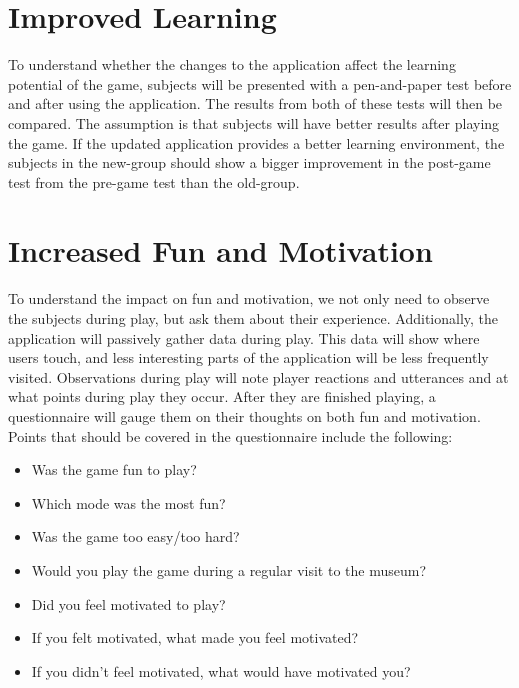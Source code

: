 
\section{Improved Learning}

To understand whether the changes to the application affect the learning potential of the game, subjects will be presented with a pen-and-paper test before and after using the application. The results from both of these tests will then be compared. The assumption is that subjects will have better results after playing the game. If the updated application provides a better learning environment, the subjects in the new-group should show a bigger improvement in the post-game test from the pre-game test than the old-group.


\section{Increased Fun and Motivation}

To understand the impact on fun and motivation, we not only need to observe the subjects during play, but ask them about their experience. Additionally, the application will passively gather data during play. This data will show where users touch, and less interesting parts of the application will be less frequently visited. Observations during play will note player reactions and utterances and at what points during play they occur. After they are finished playing, a questionnaire will gauge them on their thoughts on both fun and motivation. Points that should be covered in the questionnaire include the following:
\begin{itemize}
	\item Was the game fun to play?
	\item Which mode was the most fun?
	\item Was the game too easy/too hard?
	\item Would you play the game during a regular visit to the museum?
	\item Did you feel motivated to play?
	\item If you felt motivated, what made you feel motivated?
	\item If you didn't feel motivated, what would have motivated you?
\end{itemize}
